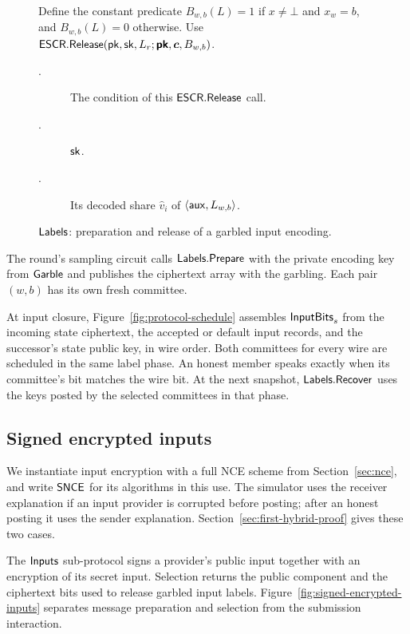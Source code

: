 \begin{figure}[tbp]
{\begin{minipage}{0.95\textwidth}
\begin{description}
    Define the constant predicate $B_{w,b}(L)=1$ if $x\neq\bot$ and
    $x_w=b$, and $B_{w,b}(L)=0$ otherwise.
    Use $\mathsf{ESCR}.\mathsf{Release}(\mathsf{pk},\mathsf{sk},L_r;\boldsymbol{\mathsf{pk}},\boldsymbol c,B_{w,b})$.
    \begin{description}
      \item[\WhenField.] The condition of this $\mathsf{ESCR}.\mathsf{Release}$ call.
      \item[\WhatField.] $\mathsf{sk}$.
      \item[\ValueField.] Its decoded share $\widehat v_i$ of
        $\langle\mathsf{aux},L_{w,b}\rangle$.
    \end{description}
\end{description}
\end{minipage}}
\caption{$\mathsf{Labels}$: preparation and release of a garbled input encoding.}
\label{fig:garbled-input-release}
\end{figure}

The round's sampling circuit calls $\mathsf{Labels}.\mathsf{Prepare}$ with the private
encoding key from $\mathsf{Garble}$ and publishes the ciphertext array with the
garbling. Each pair $(w,b)$ has its own fresh committee.

At input closure, Figure~\ref{fig:protocol-schedule} assembles
$\mathsf{InputBits}_s$ from the incoming state ciphertext, the accepted or default
input records, and the successor's state public key, in wire order.
Both committees for every wire are scheduled in the same label phase.
An honest member speaks exactly when its committee's bit matches the wire
bit. At the next snapshot, $\mathsf{Labels}.\mathsf{Recover}$ uses the keys posted by
the selected committees in that phase.

\subsection{Signed encrypted inputs}
\label{sec:signed-encrypted-inputs}

We instantiate input encryption with a full NCE scheme from
Section~\ref{sec:nce}, and write $\mathsf{SNCE}$ for its algorithms in this use.
The simulator uses the receiver explanation if an input provider is
corrupted before posting; after an honest posting it uses the sender
explanation.  Section~\ref{sec:first-hybrid-proof} gives these two cases.

The $\mathsf{Inputs}$ sub-protocol signs a provider's public input together with
an encryption of its secret input.  Selection returns the public
component and the ciphertext bits used to release garbled input labels.
Figure~\ref{fig:signed-encrypted-inputs} separates message preparation and
selection from the submission interaction.


